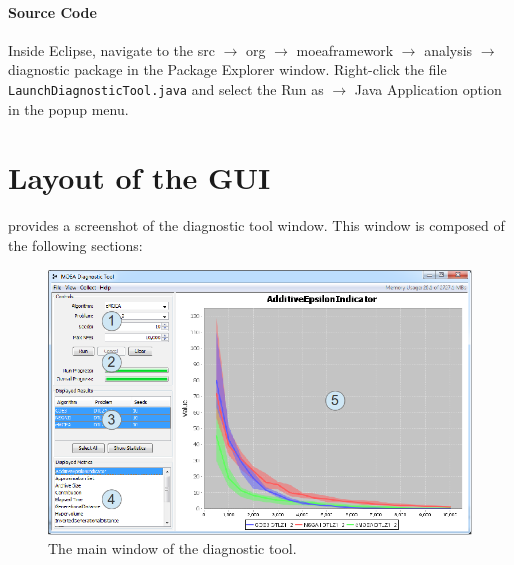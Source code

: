\paragraph{Source Code}
Inside Eclipse, navigate to the src $\rightarrow$ org $\rightarrow$ moeaframework $\rightarrow$ analysis $\rightarrow$ diagnostic package in the Package Explorer window.  Right-click the file \texttt{LaunchDiagnosticTool.java} and select the Run as $\rightarrow$ Java Application option in the popup menu.

\section{Layout of the GUI}

 provides a screenshot of the diagnostic tool window.  This window is composed of the following sections:

\begin{figure}
  \includegraphics[width=\linewidth]{diagnosticToolAnnotated.png}
  \caption{The main window of the diagnostic tool.}
  \label{fig:diagnosticToolAnnotated}
\end{figure}

